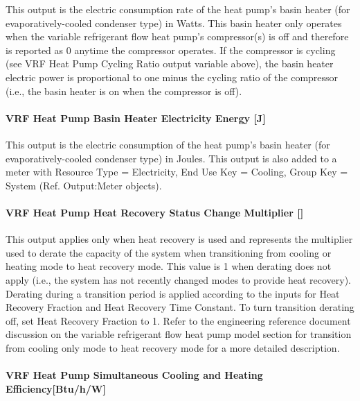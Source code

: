 This output is the electric consumption rate of the heat pump's basin heater (for evaporatively-cooled condenser type) in Watts. This basin heater only operates when the variable refrigerant flow heat pump's compressor(s) is off and therefore is reported as 0 anytime the compressor operates. If the compressor is cycling (see VRF Heat Pump Cycling Ratio output variable above), the basin heater electric power is proportional to one minus the cycling ratio of the compressor (i.e., the basin heater is on when the compressor is off).

\paragraph{VRF Heat Pump Basin Heater Electricity Energy {[}J{]}}\label{vrf-heat-pump-basin-heater-electric-energy-j}

This output is the electric consumption of the heat pump's basin heater (for evaporatively-cooled condenser type) in Joules. This output is also added to a meter with Resource Type = Electricity, End Use Key = Cooling, Group Key = System (Ref. Output:Meter objects).

\paragraph{\texorpdfstring{VRF Heat Pump Heat Recovery Status Change Multiplier {[]}}{VRF Heat Pump Heat Recovery Status Change Multiplier }}\label{vrf-heat-pump-heat-recovery-status-change-multiplier}

This output applies only when heat recovery is used and represents the multiplier used to derate the capacity of the system when transitioning from cooling or heating mode to heat recovery mode. This value is 1 when derating does not apply (i.e., the system has not recently changed modes to provide heat recovery). Derating during a transition period is applied according to the inputs for Heat Recovery Fraction and Heat Recovery Time Constant. To turn transition derating off, set Heat Recovery Fraction to 1. Refer to the engineering reference document discussion on the variable refrigerant flow heat pump model section for transition from cooling only mode to heat recovery mode for a more detailed description.

\paragraph{\texorpdfstring{VRF Heat Pump Simultaneous Cooling and Heating Efficiency{[}Btu/h/W{]}}{VRF Heat Pump Simultaneous Cooling and Heating Efficiency}}\label{vrf-heat-pump-simultaneous-cooling-and-heating-efficiency}

